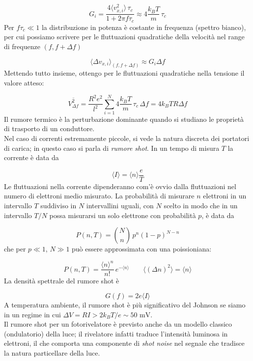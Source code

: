\documentclass[a4paper]{report}
\begin{document}
\begin{equation}
    G_i = \frac{4 \langle v^2_{x,i} \rangle \,\tau_c}{1+{2\pi f\tau_c}} \approx 4 \frac{k_B T}{m}\,\tau_c
\end{equation}
Per $f\tau_c \ll 1$ la distribuzione in potenza è costante in frequenza (spettro bianco), per cui possiamo scrivere per le fluttuazioni quadratiche della velocità nel range di frequenze $(f, f+\Delta f)$

\begin{equation}
    \langle\Delta v_{x,i}\rangle_{(f, f+\Delta f)} \approx G_i \Delta f 
\end{equation}
Mettendo tutto insieme, ottengo per le fluttuazioni quadratiche nella tensione il valore atteso:

\begin{equation}
    \overline{V^2_{\Delta f}} = \frac{R^2 e^2}{l^2}\sum_{i=1}^N 4 \frac{k_B T}{m} \,\tau_c\,\Delta f = 4 k_B T R \Delta f
\end{equation}
Il rumore termico è la perturbazione dominante quando si studiano le proprietà di trasporto di un conduttore. \\
Nel caso di correnti estremamente piccole, si vede la natura discreta dei portatori di carica; in questo caso si parla di \textit{rumore shot}. In un tempo di misura $T$ la corrente è data da

\begin{equation}
    \langle I \rangle = \langle n \rangle \frac{e}{T}
\end{equation}
Le fluttuazioni nella corrente dipenderanno com'è ovvio dalla fluttuazioni nel numero di elettroni medio misurato. La probabilità di misurare $n$ elettroni in un intervallo $T$ suddiviso in $N$ intervallini uguali, con $N$ scelto in modo che in un intervallo $T/N$ possa misurarsi un solo elettrone con probabilità $p$, è data da

\begin{equation}
    P(n,T) = \binom{N}{n} \,p^n(1-p)^{N-n} 
\end{equation}
che per $p\ll1$, $N\gg 1$ può essere approssimata con una poissioniana:

\begin{equation}
    P(n,T) = \frac{\langle n\rangle^n}{n!}\,e^{-\langle n\rangle}\qquad \langle(\Delta n)^2\rangle = \langle n\rangle
\end{equation}
La densità spettrale del rumore shot è

\begin{equation}
    G(f) = 2 e \langle I \rangle
\end{equation}
A temperatura ambiente, il rumore shot è più significativo del Johnson se siamo in un regime in cui $\Delta V = R I > 2k_B T/e \sim 50 \,\,\text{mV}$. \\
Il rumore shot per un fotorivelatore è previsto anche da un modello classico (ondulatorio) della luce;  il rivelatore infatti traduce l'intensità luminosa in elettroni, il che comporta una componente di \textit{shot noise} nel segnale che tradisce la natura particellare della luce.
\end{document}
